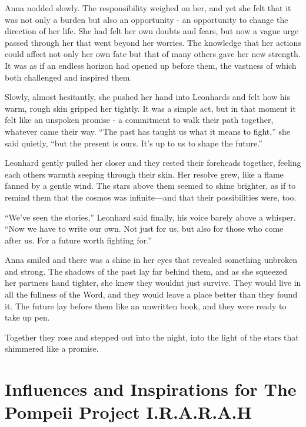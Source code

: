 \documentclass[
]{article}
\begin{document}
Anna nodded slowly. The responsibility weighed on her, and yet she felt
that it was not only a burden but also an opportunity - an opportunity
to change the direction of her life. She had felt her own doubts and
fears, but now a vague urge passed through her that went beyond her
worries. The knowledge that her actions could affect not only her own
fate but that of many others gave her new strength. It was as if an
endless horizon had opened up before them, the vastness of which both
challenged and inspired them.

Slowly, almost hesitantly, she pushed her hand into
Leonhard\textquotesingle s and felt how his warm, rough skin gripped her
tightly. It was a simple act, but in that moment it felt like an
unspoken promise - a commitment to walk their path together, whatever
came their way. ``The past has taught us what it means to fight,'' she
said quietly, ``but the present is ours. It's up to us to shape the
future.''

Leonhard gently pulled her closer and they rested their foreheads
together, feeling each other\textquotesingle s warmth seeping through
their skin. Her resolve grew, like a flame fanned by a gentle wind. The
stars above them seemed to shine brighter, as if to remind them that the
cosmos was infinite---and that their possibilities were, too.

``We've seen the stories,'' Leonhard said finally, his voice barely
above a whisper. ``Now we have to write our own. Not just for us, but
also for those who come after us. For a future worth fighting for.''

Anna smiled and there was a shine in her eyes that revealed something
unbroken and strong. The shadows of the past lay far behind them, and as
she squeezed her partner\textquotesingle s hand tighter, she knew they
wouldn\textquotesingle t just survive. They would live in all the
fullness of the Word, and they would leave a place better than they
found it. The future lay before them like an unwritten book, and they
were ready to take up pen.

Together they rose and stepped out into the night, into the light of the
stars that shimmered like a promise.

\section{Influences and Inspirations for The Pompeii Project
I.R.A.R.A.H}\label{influences-and-inspirations-for-the-pompeii-project-i.r.a.r.a.h}
\end{document}
